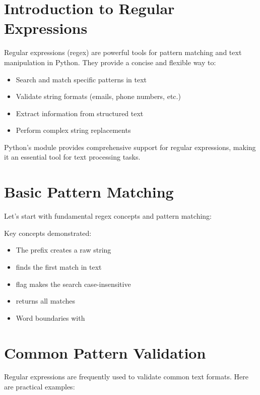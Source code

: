 \section{Introduction to Regular Expressions}

Regular expressions (regex) are powerful tools for pattern matching and text manipulation in Python. They provide a concise and flexible way to:

\begin{itemize}
    \item Search and match specific patterns in text
    \item Validate string formats (emails, phone numbers, etc.)
    \item Extract information from structured text
    \item Perform complex string replacements
\end{itemize}

Python's  module provides comprehensive support for regular expressions, making it an essential tool for text processing tasks.

\section{Basic Pattern Matching}

Let's start with fundamental regex concepts and pattern matching:

\begin{macterminal}

\end{macterminal}

Key concepts demonstrated:
\begin{itemize}
    \item The  prefix creates a raw string
    \item {} finds the first match in text
    \item {} flag makes the search case-insensitive
    \item {} returns all matches
    \item Word boundaries with 
\end{itemize}

\section{Common Pattern Validation}

Regular expressions are frequently used to validate common text formats. Here are practical examples:

